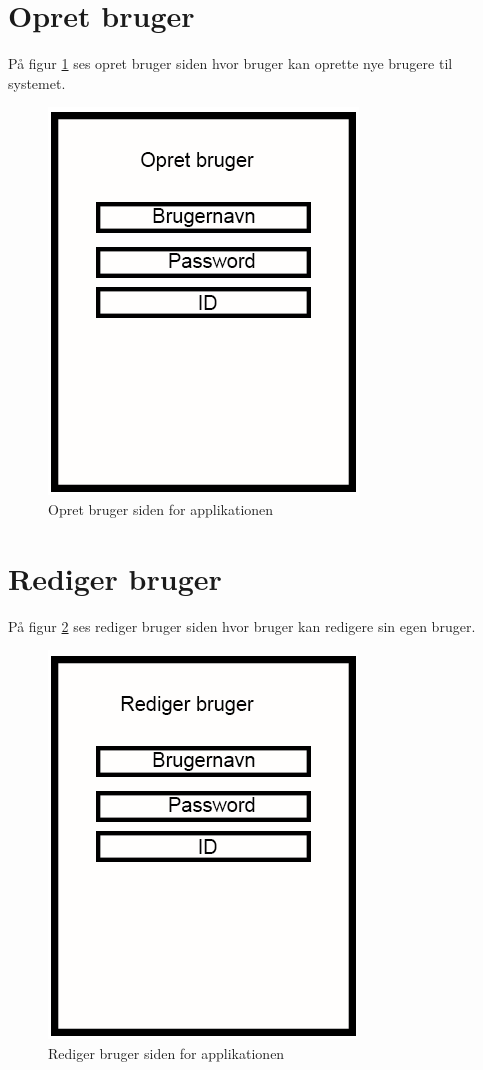 \section{Opret bruger}\label{sec:OpretBrugerMock}
På figur \ref{fig:OpretBrugerMock} ses opret bruger siden hvor bruger kan oprette nye brugere til systemet.

\begin{figure}[H]
	\centering
	\includegraphics[width=0.4\linewidth]{MockUps/Mock/Ramboell-OpretBruger}
	\caption{Opret bruger siden for applikationen}
	\label{fig:OpretBrugerMock}
\end{figure}

\clearpage

\section{Rediger bruger}\label{sec:RedigerBrugerMock}
På figur \ref{fig:RedigerBrugerMock} ses rediger bruger siden hvor bruger kan redigere sin egen bruger.

\begin{figure}[H]
	\centering
	\includegraphics[width=0.4\linewidth]{MockUps/Mock/Ramboell-RedigerBruger}
	\caption{Rediger bruger siden for applikationen}
	\label{fig:RedigerBrugerMock}
\end{figure}

